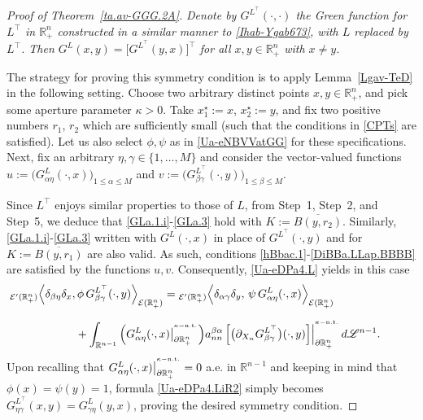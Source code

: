 \documentclass[11pt,reqno]{amsart}
\numberwithin{equation}{section}
\theoremstyle{remark}
\begin{document}
\begin{proof}[Proof of Theorem~\ref{ta.av-GGG.2A}]
\vskip 0.08in
 \textit{Denote by $G^{L^\top}(\cdot,\cdot)$ the Green 
function for $L^{\top}$ in ${\mathbb{R}}^n_{+}$ constructed in a similar manner 
to \eqref{Ihab-Ygab673}, with $L$ replaced by $L^{\top}$. 
Then $G^L(x,y)=\big[G^{L^\top}\!\!(y,x)\big]^\top$ for all 
$x,y\in{\mathbb{R}}^n_{+}$ with $x\not=y$.}

\vskip 0.08in
The strategy for proving this symmetry condition is to apply Lemma~\ref{Lgav-TeD} 
in the following setting. Choose two arbitrary distinct points $x,y\in{\mathbb{R}}^n_{+}$, 
and pick some aperture parameter $\kappa>0$. Take $x_1^\star:=x$, $x_2^\star:=y$, 
and fix two positive numbers $r_1$, $r_2$ which are sufficiently small (such that the conditions 
in \eqref{CPTs} are satisfied). Let us also select $\phi,\psi$ as in \eqref{Ua-eNBVVatGG} for these specifications. 
Next, fix an arbitrary $\eta,\gamma\in\{1,\dots,M\}$ and consider the vector-valued functions 
$u:=\big(G^L_{\alpha\eta}(\cdot,x)\big)_{1\leq\alpha\leq M}$ and 
$v:=\big(G^{L^\top}_{\beta\gamma}(\cdot,y)\big)_{1\leq\beta\leq M}$.

Since $L^\top$ enjoys similar properties to those of $L$, from Step~1, Step~2, and Step~5, we deduce that 
\eqref{GLa.1.i}-\eqref{GLa.3} hold with $K:=\overline{B(y,r_2)}$. Similarly, \eqref{GLa.1.i}-\eqref{GLa.3} written with 
$G^L(\cdot,x)$ in place of $G^{L^\top}(\cdot,y)$ and for $K:=\overline{B(y,r_1)}$ are also valid. 
As such, conditions \eqref{hBbac.1}-\eqref{DiBBa.LLap.BBBB} are satisfied by the functions $u,v$. 
Consequently, \eqref{Ua-eDPa4.L} yields in this case 
%
\begin{align}\label{Ua-eDPa4.LiR2}
&\hskip -0.40in
{}_{{\mathcal{E}}'(\mathbb{R}^{n}_{+})}\Big\langle\delta_{\beta\eta}\delta_x,
\phi\,G^{L^\top}_{\beta\gamma}(\cdot,y)\Big\rangle_{{\mathcal{E}}(\mathbb{R}^{n}_{+})}
={}_{{\mathcal{E}}'(\mathbb{R}^{n}_{+})}\Big\langle\delta_{\alpha\gamma}\delta_y,\,
\psi\,G^L_{\alpha\eta}(\cdot,x)\Big\rangle_{{\mathcal{E}}(\mathbb{R}^{n}_{+})}
\nonumber\\[6pt]
&\hskip 0.40in
+\int_{\mathbb{R}^{n-1}}
\Big(G^L_{\alpha\eta}(\cdot,x)\big|_{\partial\mathbb{R}^{n}_{+}}^{{}^{\kappa-{\rm n.t.}}}\Big) 
a^{\beta\alpha}_{nn}\,\Big[\big(\partial_{X_n} G^{L^\top}_{\beta\gamma}\big)(\cdot,y)\Big]
\Big|_{\partial\mathbb{R}^{n}_{+}}^{{}^{\kappa-{\rm n.t.}}}\,d{\mathscr{L}}^{n-1}.
\end{align}
%
Upon recalling that $G^L_{\alpha\eta}(\cdot,x)\big|_{\partial\mathbb{R}^{n}_{+}}^{{}^{\kappa-{\rm n.t.}}}=0$ 
a.e. in ${\mathbb{R}}^{n-1}$ and keeping in mind that $\phi(x)=\psi(y)=1$, formula \eqref{Ua-eDPa4.LiR2} 
simply becomes $G^{L^\top}_{\eta\gamma}(x,y)=G^{L}_{\gamma\eta}(y,x)$, proving the desired symmetry condition.  


\end{proof}
\end{document}

